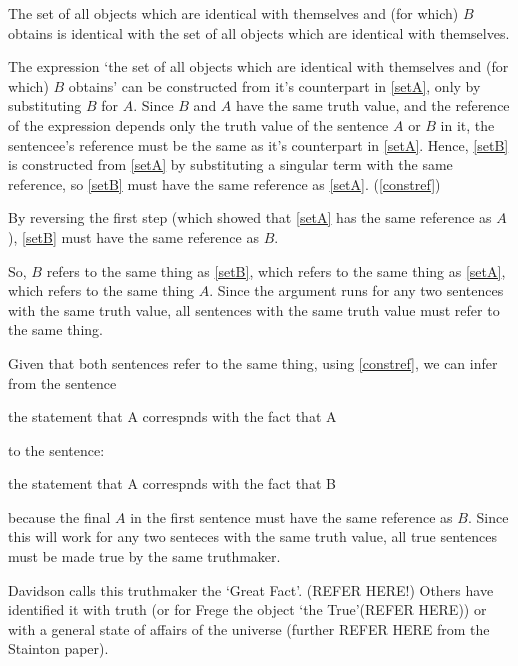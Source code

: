 	\begin{example} \label{setB}
	The set of all objects which are identical with themselves and (for which) $B$ obtains is identical with the set of all objects which are identical with themselves.
	\end{example}

The expression `the set of all objects which are identical with themselves and (for which) $B$ obtains' can be constructed from it's counterpart in \ref{setA}, only by substituting $B$ for $A$.
Since $B$ and $A$ have the same truth value, and the reference of the expression depends only the truth value of the sentence $A$ or $B$ in it, the sentencee's reference must be the same as it's counterpart in \ref{setA}.
Hence, \ref{setB} is constructed from \ref{setA} by substituting a singular term with the same reference, so \ref{setB} must have the same reference as \ref{setA}. 
(\ref{constref})

By reversing the first step (which showed that \ref{setA} has the same reference as $A$), \ref{setB} must have the same reference as $B$.

So, $B$ refers to the same thing as \ref{setB}, which refers to the same thing as \ref{setA}, which refers to the same thing $A$.
Since the argument runs for any two sentences with the same truth value, all sentences with the same truth value must refer to the same thing.

Given that both sentences refer to the same thing, using \ref{constref}, we can infer from the sentence

	\begin{example} \label{stateA}
	the statement that A correspnds with the fact that A
	\end{example}

to the sentence:

	\begin{example} \label{stateB}
	the statement that A correspnds with the fact that B
	\end{example}


because the final $A$ in the first sentence must have the same reference as $B$.
Since this will work for any two senteces with the same truth value, all true sentences must be made true by the same truthmaker.

Davidson calls this truthmaker the `Great Fact'.
(REFER HERE!)
Others have identified it with truth (or for Frege the object `the True'(REFER HERE)) or with a general state of affairs of the universe (further REFER HERE from the Stainton paper).

